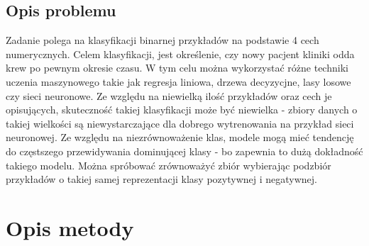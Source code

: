 \documentclass[11pt, a4paper, notitlepage]{report}
\begin{document}
\section{Opis problemu}
	Zadanie polega na klasyfikacji binarnej przykładów na podstawie 4 cech numerycznych. Celem klasyfikacji, jest określenie, czy nowy pacjent kliniki odda krew po pewnym okresie czasu. W tym celu można wykorzystać różne techniki uczenia maszynowego
	takie jak regresja liniowa, drzewa decyzycjne, lasy losowe czy sieci neuronowe. Ze względu na niewielką ilość przykładów oraz cech je opisujących, skuteczność takiej klasyfikacji może być niewielka - zbiory danych o takiej wielkości są niewystarczające
	dla dobrego wytrenowania na przykład sieci neuronowej. Ze względu na niezrównoważenie klas, modele mogą mieć tendencję do częstszego przewidywania dominującej klasy - bo zapewnia to dużą dokładność takiego modelu. Można spróbować zrównoważyć
	zbiór wybierając podzbiór przykładów o takiej samej reprezentacji klasy pozytywnej i negatywnej.

\chapter{Opis metody}
\end{document}

